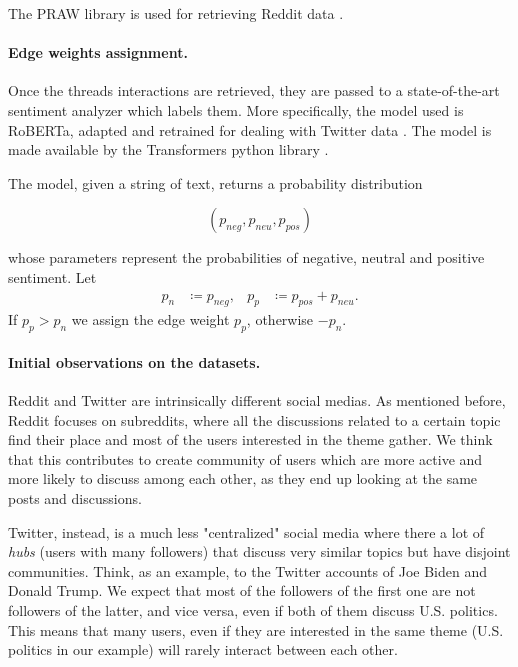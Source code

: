 The PRAW library is used for retrieving Reddit data \cite{praw}.

\paragraph{Edge weights assignment.}%
\label{par:assigning_edge_weights}

Once the threads interactions are retrieved, they are passed to a state-of-the-art
sentiment analyzer which labels them. More specifically, the model used is
RoBERTa, adapted and retrained for dealing with Twitter
data \cite{Barbieri2020}. The model is made available by the Transformers
python library \cite{wolf-etal-2020-transformers}.

The model, given a string of text, returns a probability distribution

\begin{equation*}
	(p_{neg}, p_{neu}, p_{pos})
\end{equation*}

whose parameters represent the probabilities of negative,
neutral and positive sentiment. Let
\begin{align}
	\label{eq:}
	p_n & \coloneqq p_{neg}, & p_p & \coloneqq p_{pos} + p_{neu}.
\end{align}
If $p_p > p_n $ we assign the edge weight $p_p$, otherwise $-p_n$.

%

\paragraph{Initial observations on the datasets.}
\label{sub:some_observations_on_the_datasets}
Reddit and Twitter are intrinsically different social medias. As mentioned
before, Reddit focuses on subreddits, where all the discussions related to a
certain topic find their place and most of the users interested in the
theme gather. We think that this contributes to create community of users which are more
active and more likely to discuss among each other, as they end up looking at the
same posts and discussions.

Twitter, instead, is a much less "centralized" social media where there a lot
of \emph{hubs} (users with many followers) that discuss very similar topics but
have disjoint communities.
Think, as an example, to the Twitter accounts of Joe Biden and Donald Trump. We expect that
most of the followers of the first one are not followers of the latter, and
vice versa, even if both of them discuss U.S. politics. This means that many
users, even if they are interested in the same theme (U.S. politics in our example)
will rarely interact between each other.

